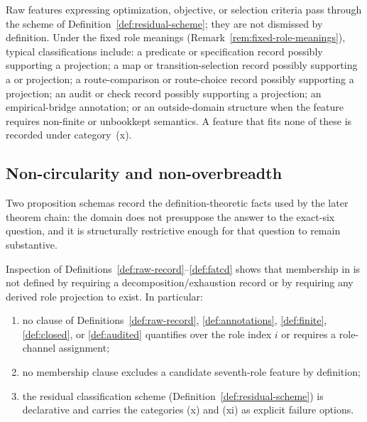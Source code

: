 \begin{remark}\label{rem:optimization-not-excluded}
Raw features expressing optimization, objective, or selection criteria
pass through the scheme of Definition~\ref{def:residual-scheme}; they
are not dismissed by definition. Under the fixed role meanings
(Remark~\ref{rem:fixed-role-meanings}), typical classifications
include: a predicate or specification record possibly supporting a
\Ptwo{} projection; a map or transition-selection record possibly
supporting a \Pone{} or \Pfour{} projection; a route-comparison or
route-choice record possibly supporting a \Pthree{} projection; an
audit or check record possibly supporting a \Psix{} projection; an
empirical-bridge annotation; or an outside-domain structure when the
feature requires non-finite or unbookkept semantics. A feature that
fits none of these is recorded under category~(x).
\end{remark}

\subsection{Non-circularity and non-overbreadth}\label{subsec:non-circularity-non-overbreadth}

Two proposition schemas record the definition-theoretic facts used by
the later theorem chain: the domain does not presuppose the answer to
the exact-six question, and it is structurally restrictive enough
for that question to remain substantive.

\begin{proposition}\label{prop:non-circularity}
Inspection of Definitions~\ref{def:raw-record}--\ref{def:fatcd} shows that
membership in \FATCD{} is not defined by requiring a decomposition/exhaustion record or
by requiring any derived role projection to exist. In particular:
\begin{enumerate}[label=(\roman*),topsep=2pt,itemsep=1pt]
  \item no clause of Definitions~\ref{def:raw-record},
    \ref{def:annotations}, \ref{def:finite}, \ref{def:closed}, or
    \ref{def:audited} quantifies over the role index \(i\) or requires a
    role-channel assignment;
  \item no membership clause excludes a candidate seventh-role feature by
    definition;
  \item the residual classification scheme (Definition~\ref{def:residual-scheme})
    is declarative and carries the categories (x) and (xi) as explicit
    failure options.
\end{enumerate}
\end{proposition}

